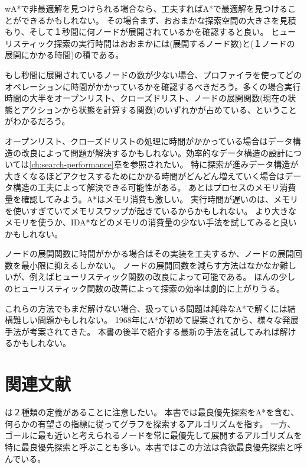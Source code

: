 wA*で非最適解を見つけられる場合なら、工夫すればA*で最適解を見つけることができるかもしれない。
その場合まず、おおまかな探索空間の大きさを見積もり、そして１秒間に何ノードが展開されているかを確認すると良い。
ヒューリスティック探索の実行時間はおおまかには(展開するノード数)と(１ノードの展開にかかる時間)の積である。

もし秒間に展開されているノードの数が少ない場合、プロファイラを使ってどのオペレーションに時間がかかっているかを確認するべきだろう。多くの場合実行時間の大半をオープンリスト、クローズドリスト、ノードの展開関数(現在の状態とアクションから状態を計算する関数)のいずれかが占めている、ということがわかるだろう。

オープンリスト、クローズドリストの処理に時間がかかっている場合はデータ構造の改良によって問題が解決するかもしれない。効率的なデータ構造の設計については\ref{ch:search-performance}章を参照されたい。
特に探索が進みデータ構造が大きくなるほどアクセスするためにかかる時間がどんどん増えていく場合はデータ構造の工夫によって解決できる可能性がある。
あとはプロセスのメモリ消費量を確認してみよう。A*はメモリ消費も激しい。
実行時間が遅いのは、メモリを使いすぎていてメモリスワップが起きているからかもしれない。
より大きなメモリを使うか、IDA*などのメモリの消費量の少ない手法を試してみると良いかもしれない。

ノードの展開関数に時間がかかる場合はその実装を工夫するか、ノードの展開回数を最小限に抑えるしかない。
ノードの展開回数を減らす方法はなかなか難しいが、例えばヒューリスティック関数の改良によって可能である。
ほんの少しのヒューリスティック関数の改善によって探索の効率は劇的に上がりうる。

これらの方法でもまだ解けない場合、扱っている問題は純粋なA*で解くには結構難しい問題かもしれない。
1968年にA*が初めて提案されてから、様々な発展手法が考案されてきた。
本書の後半で紹介する最新の手法を試してみれば解けるかもしれない。




\section{関連文献}

は２種類の定義があることに注意したい。
本書では最良優先探索をA*を含む、何らかの有望さの指標に従ってグラフを探索するアルゴリズムを指す。
一方、ゴールに最も近いと考えられるノードを常に最優先して展開するアルゴリズムを特に最良優先探索と呼ぶことも多い。本書ではこの方法は貪欲最良優先探索と呼んでいる。

